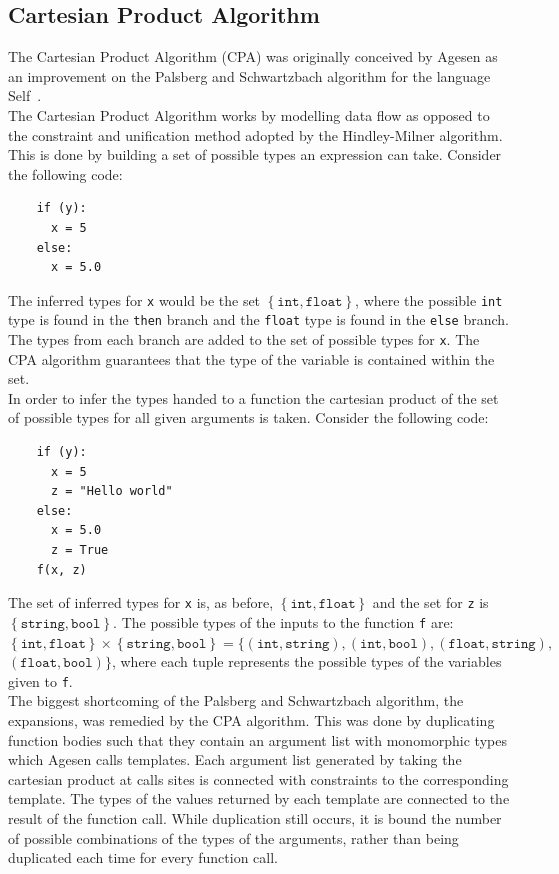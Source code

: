 \documentclass[12pt, titlepage]{article}
\begin{document}
\subsection{Cartesian Product Algorithm}
The Cartesian Product Algorithm (CPA) was originally conceived by Agesen as an improvement on the Palsberg and Schwartzbach algorithm for the language Self~\cite{agesen95}. \\
\indent The Cartesian Product Algorithm works by modelling data flow as opposed to the constraint and unification method adopted by the Hindley-Milner algorithm. This is done by building a set of possible types an expression can take. Consider the following code:
\begin{lstlisting}
    if (y):	
      x = 5     
    else:
      x = 5.0  
\end{lstlisting}
The inferred types for \texttt{x} would be the set $\mathtt{\left\{ {int, float}\right\}}$, where the possible \texttt{int} type is found in the \texttt{then} branch and the \texttt{float} type is found in the \texttt{else} branch. The types from each branch are added to the set of possible types for \texttt{x}. The CPA algorithm guarantees that the type of the variable is contained within the set. \\
\indent In order to infer the types handed to a function the cartesian product of the set of possible types for all given arguments is taken. Consider the following code:
\begin{lstlisting}
    if (y):	
      x = 5 
      z = "Hello world"    
    else:
      x = 5.0 
      z = True
    f(x, z)
\end{lstlisting}
The set of inferred types for \texttt{x} is, as before, $\mathtt{\left\{ {int, float}\right\}}$ and the set for \texttt{z} is $\mathtt{\left\{ {string, bool}\right\}}$. The possible types of the inputs to the function \texttt{f} are: $\mathtt{\left\{ {int, float}\right\} \times \left\{ {string, bool}\right\} = \{ (int, string), (int, bool),(float, string),}$ \\ $\mathtt{ (float, bool)\}}$, where each tuple represents the possible types of the variables given to \texttt{f}. \\
\indent The biggest shortcoming of the Palsberg and Schwartzbach algorithm, the expansions, was remedied by the CPA algorithm. This was done by duplicating function bodies such that they contain an argument list with monomorphic types which Agesen calls templates. Each argument list generated by taking the cartesian product at calls sites is connected with constraints to the corresponding template. The types of the values returned by each template are connected to the result of the function call. While duplication still occurs, it is bound the number of possible combinations of the types of the arguments, rather than being duplicated each time for every function call.
\end{document}
